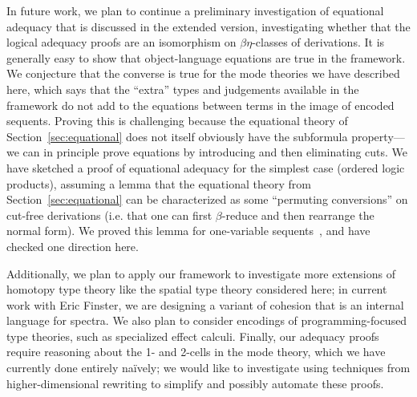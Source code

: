 
In future work, we plan to continue a preliminary investigation of
equational adequacy that is discussed in the extended version,
investigating whether that the logical adequacy proofs are an
isomorphism on $\beta\eta$-classes of derivations.  It is generally easy
to show that object-language equations are true in the framework.  We
conjecture that the converse is true for the mode theories we have
described here, which says that the ``extra'' types and judgements
available in the framework do not add to the equations between terms in
the image of encoded sequents.  Proving this is challenging because the
equational theory of Section~\ref{sec:equational} does not itself
obviously have the subformula property---we can in principle prove
equations by introducing and then eliminating cuts.  We have sketched a
proof of equational adequacy for the simplest case (ordered logic
products), assuming a lemma that the equational theory from
Section~\ref{sec:equational} can be characterized as some ``permuting
conversions'' on cut-free derivations (i.e. that one can first
$\beta$-reduce and then rearrange the normal form).  We proved this
lemma for one-variable sequents~\citep{ls16adjoint}, and have checked
one direction here.

Additionally, we plan to apply our framework to investigate more
extensions of homotopy type theory like the spatial type theory
considered here; in current work with Eric Finster, we are designing a
variant of cohesion that is an internal language for spectra.  We also
plan to consider encodings of programming-focused type theories, such as
specialized effect calculi.  Finally, our adequacy proofs require
reasoning about the 1- and 2-cells in the mode theory, which we have
currently done entirely na\"ively; we would like to investigate using
techniques from higher-dimensional rewriting to simplify and possibly
automate these proofs.

